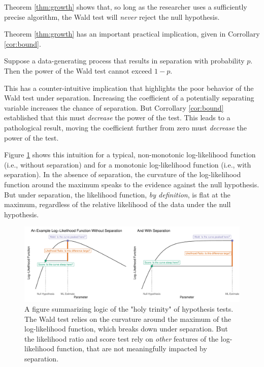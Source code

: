 \documentclass[
]{article}
\begin{document}
\noindent Theorem \ref{thm:growth} shows that, so long as the researcher
uses a sufficiently precise algorithm, the Wald test will \emph{never}
reject the null hypothesis.

Theorem \ref{thm:growth} has an important practical implication, given
in Corrollary \ref{cor:bound}.

\begin{corrollary}\label{cor:bound}
Suppose a data-generating process that results in separation with probability $p$. Then the power of the Wald test cannot exceed $1 - p$.
\end{corrollary}

This has a counter-intuitive implication that highlights the poor
behavior of the Wald test under separation. Increasing the coefficient
of a potentially separating variable increases the chance of separation.
But Corrollary \ref{cor:bound} established that this must
\emph{decrease} the power of the test. This leads to a pathological
result, moving the coefficient further from zero must \emph{decrease}
the power of the test.

Figure \ref{fig:trinity} shows this intuition for a typical,
non-monotonic log-likelihood function (i.e., without separation) and for
a monotonic log-likelihood function (i.e., with separation). In the
absence of separation, the curvature of the log-likelihood function
around the maximum speaks to the evidence against the null hypothesis.
But under separation, the likelihood function, \emph{by definition}, is
flat at the maximum, regardless of the relative likelihood of the data
under the null hypothesis.

\begin{figure}[h]
\includegraphics[width=\textwidth]{doc/fig/intuition.pdf}
\caption{A figure summarizing logic of the "holy trinity" of hypothesis tests. The Wald test relies on the curvature around the maximum of the log-likelihood function, which breaks down under separation. But the likelihood ratio and score test rely on \textit{other} features of the log-likelihood function, that are not meaningfully impacted by separation.}\label{fig:trinity}
\end{figure}
\end{document}
